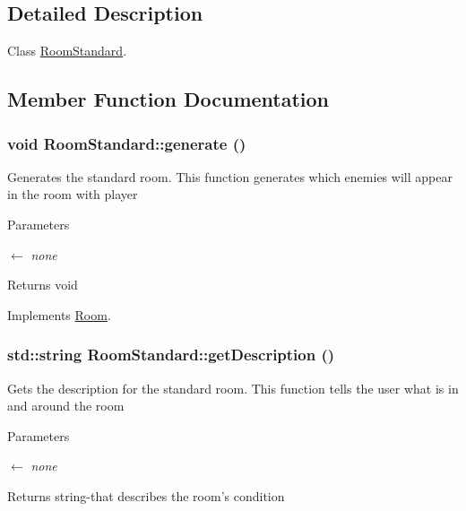 \subsection{Detailed Description}
Class \hyperlink{classRoomStandard}{RoomStandard}. 

\subsection{Member Function Documentation}
\hypertarget{classRoomStandard_ae4b216dd6c57cc03dee20e1fd81c1180}{
\subsubsection[{generate}]{\setlength{\rightskip}{0pt plus 5cm}void RoomStandard::generate ()}}
\label{classRoomStandard_ae4b216dd6c57cc03dee20e1fd81c1180}


Generates the standard room. This function generates which enemies will appear in the room with player 
\begin{DoxyParams}{Parameters}
\item[\mbox{$\leftarrow$} {\em none}]\end{DoxyParams}
\begin{DoxyReturn}{Returns}
void 
\end{DoxyReturn}


Implements \hyperlink{classRoom_a3556128b8e7f544fa618576fbab4b52e}{Room}.\hypertarget{classRoomStandard_af1f9146a7d38e33b3f546f41ea632e9b}{
\subsubsection[{getDescription}]{\setlength{\rightskip}{0pt plus 5cm}std::string RoomStandard::getDescription ()}}
\label{classRoomStandard_af1f9146a7d38e33b3f546f41ea632e9b}


Gets the description for the standard room. This function tells the user what is in and around the room 
\begin{DoxyParams}{Parameters}
\item[\mbox{$\leftarrow$} {\em none}]\end{DoxyParams}
\begin{DoxyReturn}{Returns}
string-\/that describes the room's condition 
\end{DoxyReturn}



